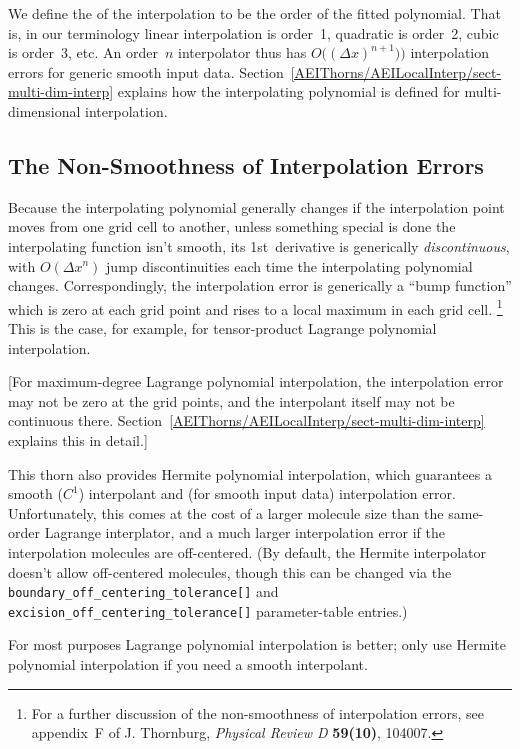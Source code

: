 We define the  of the interpolation to be the order of
the fitted polynomial.  That is, in our terminology linear interpolation
is order~1, quadratic is order~2, cubic is order~3, etc.  An order~$n$
interpolator thus has $O\big((\Delta x)^{n+1})\big)$ interpolation errors
for generic smooth input data.
Section~\ref{AEIThorns/AEILocalInterp/sect-multi-dim-interp} explains how the
interpolating polynomial is defined for multi-dimensional interpolation.


\subsection{The Non-Smoothness of Interpolation Errors}

Because the interpolating polynomial generally changes if
the interpolation point moves from one grid cell to another, unless
something special is done the interpolating function isn't smooth,
\ie{} its 1st~derivative is generically {\em discontinuous\/},
with $O(\Delta x^n)$ jump discontinuities each time the interpolating
polynomial changes.  Correspondingly, the interpolation error is
generically a ``bump function'' which is zero at each grid point
and rises to a local maximum in each grid cell.%
\footnote{%
	 For a further discussion of the non-smoothness of
	 interpolation errors, see appendix~F of J. Thornburg,
	 \textit{Physical Review D} \textbf{59(10)}, 104007.
	 }%
{}  This is the case, for example, for tensor-product Lagrange
polynomial interpolation.%
	 

[For maximum-degree Lagrange polynomial interpolation, the
interpolation error may not be zero at the grid points, and the
interpolant itself may not be continuous there.  
Section~\ref{AEIThorns/AEILocalInterp/sect-multi-dim-interp} explains this
in detail.]

This thorn also provides Hermite polynomial interpolation, which
guarantees a smooth ($C^1$) interpolant and (for smooth input data)
interpolation error.  Unfortunately, this comes at the cost of a
larger molecule size than the same-order Lagrange interplator, and
a much larger interpolation error if the interpolation molecules are
off-centered.  (By default, the Hermite interpolator doesn't allow
off-centered molecules, though this can be changed via the
\verb|boundary_off_centering_tolerance[]| and
\verb|excision_off_centering_tolerance[]| parameter-table entries.)

For most purposes Lagrange polynomial interpolation is better;
only use Hermite polynomial interpolation if you need a smooth
interpolant.

